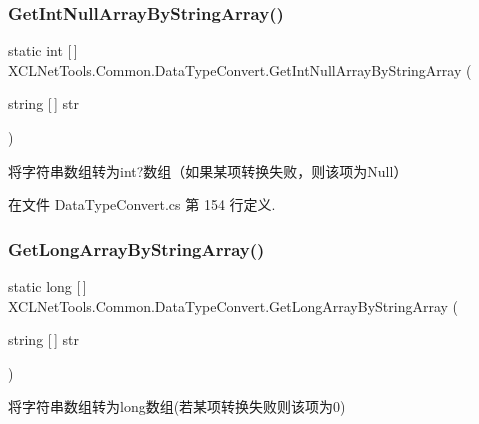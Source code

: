 \subsubsection{\texorpdfstring{Get\+Int\+Null\+Array\+By\+String\+Array()}{GetIntNullArrayByStringArray()}}
{\footnotesize\ttfamily static int \mbox{[}$\,$\mbox{]} X\+C\+L\+Net\+Tools.\+Common.\+Data\+Type\+Convert.\+Get\+Int\+Null\+Array\+By\+String\+Array (\begin{DoxyParamCaption}\item[{string \mbox{[}$\,$\mbox{]}}]{str }\end{DoxyParamCaption})\hspace{0.3cm}{\ttfamily [static]}}



将字符串数组转为int?数组（如果某项转换失败，则该项为\+Null） 



在文件 Data\+Type\+Convert.\+cs 第 154 行定义.

\mbox{\label{class_x_c_l_net_tools_1_1_common_1_1_data_type_convert_ab6f926a9f94557017048ab3f8e4888ea}} 
\subsubsection{\texorpdfstring{Get\+Long\+Array\+By\+String\+Array()}{GetLongArrayByStringArray()}\hspace{0.1cm}{\footnotesize\ttfamily [1/2]}}
{\footnotesize\ttfamily static long \mbox{[}$\,$\mbox{]} X\+C\+L\+Net\+Tools.\+Common.\+Data\+Type\+Convert.\+Get\+Long\+Array\+By\+String\+Array (\begin{DoxyParamCaption}\item[{string \mbox{[}$\,$\mbox{]}}]{str }\end{DoxyParamCaption})\hspace{0.3cm}{\ttfamily [static]}}



将字符串数组转为long数组(若某项转换失败则该项为0) 



